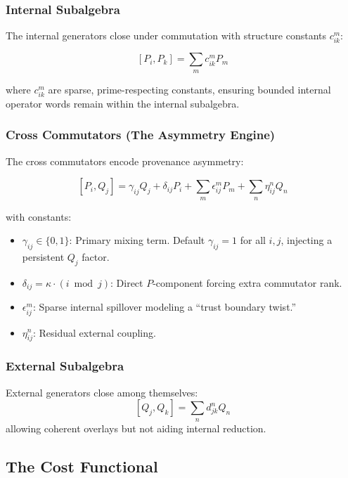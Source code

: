 \documentclass[12pt]{article}
\theoremstyle{plain}
\theoremstyle{definition}
\theoremstyle{remark}
\begin{document}
\subsubsection{Internal Subalgebra}

The internal generators close under commutation with structure constants $c_{ik}^m$:

\[
[P_i, P_k] = \sum_{m} c_{ik}^m P_m
\]

where $c_{ik}^m$ are sparse, prime-respecting constants, ensuring bounded internal operator words remain within the internal subalgebra.

\subsubsection{Cross Commutators (The Asymmetry Engine)}

The cross commutators encode provenance asymmetry:

\[
[P_i, Q_j] = \gamma_{ij} Q_j + \delta_{ij} P_i + \sum_{m} \epsilon_{ij}^m P_m + \sum_{n} \eta_{ij}^n Q_n
\]

with constants:
\begin{itemize}
    \item $\gamma_{ij} \in \{0,1\}$: Primary mixing term. Default $\gamma_{ij}=1$ for all $i,j$, injecting a persistent $Q_j$ factor.
    \item $\delta_{ij} = \kappa \cdot (i \bmod j)$: Direct $P$-component forcing extra commutator rank.
    \item $\epsilon_{ij}^m$: Sparse internal spillover modeling a ``trust boundary twist.''
    \item $\eta_{ij}^n$: Residual external coupling.
\end{itemize}


\subsubsection{External Subalgebra}

External generators close among themselves:
\[
[Q_j, Q_k] = \sum_{n} d_{jk}^n Q_n
\]
allowing coherent overlays but not aiding internal reduction.

\subsection{The Cost Functional}
\end{document}
